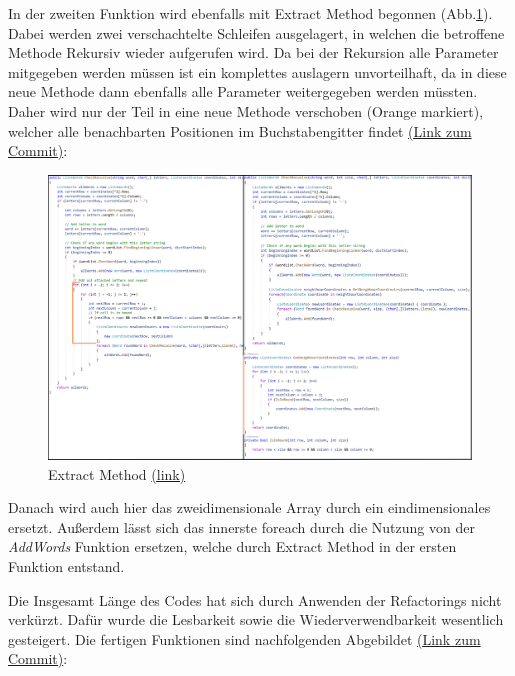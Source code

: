 In der zweiten Funktion wird ebenfalls mit Extract Method begonnen (Abb.\ref{Abb:ExtractMethod2}). Dabei werden zwei verschachtelte Schleifen ausgelagert, in welchen die betroffene Methode Rekursiv wieder aufgerufen wird. Da bei der Rekursion alle Parameter mitgegeben werden müssen ist ein komplettes auslagern unvorteilhaft, da in diese neue Methode dann ebenfalls alle Parameter weitergegeben werden müssten. Daher wird nur der Teil in eine neue Methode verschoben (Orange markiert), welcher alle benachbarten Positionen im Buchstabengitter findet \href{https://github.com/EinToni/Wortfinder/commit/23cf0b7d1165c1d17235d68f8fca35682ba233ad}{(Link zum Commit)}:
\newpage
\begin{figure}[!ht]
  \centering
  \includegraphics[width=\textwidth]{Bilder/ExtractMethod2.PNG}
  \caption[Extract Method]{Extract Method \href{https://github.com/EinToni/WortfinderDoku/blob/main/Bilder/ExtractMethod2.png}{(link)}}
  \label{Abb:ExtractMethod2}
\end{figure}

Danach wird auch hier das zweidimensionale Array durch ein eindimensionales ersetzt. Außerdem lässt sich das innerste foreach durch die Nutzung von der \textit{AddWords} Funktion ersetzen, welche durch Extract Method in der ersten Funktion entstand. 


Die Insgesamt Länge des Codes hat sich durch Anwenden der Refactorings nicht verkürzt. Dafür wurde die Lesbarkeit sowie die Wiederverwendbarkeit wesentlich gesteigert. Die fertigen Funktionen sind nachfolgenden Abgebildet \href{https://github.com/EinToni/Wortfinder/commit/e56ec221727039af2f0b6c06985f3b0edf8bdf3c}{(Link zum Commit)}:


